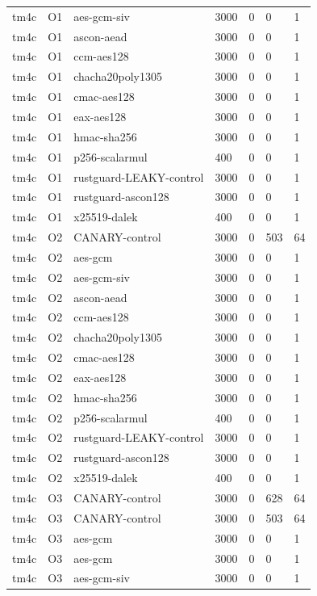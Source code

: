 \begin{table}[t]
\begin{tabular}{lllllll}
    tm4c & O1 & aes-gcm-siv & 3000 & 0 & 0 & 1 \\
    tm4c & O1 & ascon-aead & 3000 & 0 & 0 & 1 \\
    tm4c & O1 & ccm-aes128 & 3000 & 0 & 0 & 1 \\
    tm4c & O1 & chacha20poly1305 & 3000 & 0 & 0 & 1 \\
    tm4c & O1 & cmac-aes128 & 3000 & 0 & 0 & 1 \\
    tm4c & O1 & eax-aes128 & 3000 & 0 & 0 & 1 \\
    tm4c & O1 & hmac-sha256 & 3000 & 0 & 0 & 1 \\
    tm4c & O1 & p256-scalarmul & 400 & 0 & 0 & 1 \\
    tm4c & O1 & rustguard-LEAKY-control & 3000 & 0 & 0 & 1 \\
    tm4c & O1 & rustguard-ascon128 & 3000 & 0 & 0 & 1 \\
    tm4c & O1 & x25519-dalek & 400 & 0 & 0 & 1 \\
    tm4c & O2 & CANARY-control & 3000 & 0 & 503 & 64 \\
    tm4c & O2 & aes-gcm & 3000 & 0 & 0 & 1 \\
    tm4c & O2 & aes-gcm-siv & 3000 & 0 & 0 & 1 \\
    tm4c & O2 & ascon-aead & 3000 & 0 & 0 & 1 \\
    tm4c & O2 & ccm-aes128 & 3000 & 0 & 0 & 1 \\
    tm4c & O2 & chacha20poly1305 & 3000 & 0 & 0 & 1 \\
    tm4c & O2 & cmac-aes128 & 3000 & 0 & 0 & 1 \\
    tm4c & O2 & eax-aes128 & 3000 & 0 & 0 & 1 \\
    tm4c & O2 & hmac-sha256 & 3000 & 0 & 0 & 1 \\
    tm4c & O2 & p256-scalarmul & 400 & 0 & 0 & 1 \\
    tm4c & O2 & rustguard-LEAKY-control & 3000 & 0 & 0 & 1 \\
    tm4c & O2 & rustguard-ascon128 & 3000 & 0 & 0 & 1 \\
    tm4c & O2 & x25519-dalek & 400 & 0 & 0 & 1 \\
    tm4c & O3 & CANARY-control & 3000 & 0 & 628 & 64 \\
    tm4c & O3 & CANARY-control & 3000 & 0 & 503 & 64 \\
    tm4c & O3 & aes-gcm & 3000 & 0 & 0 & 1 \\
    tm4c & O3 & aes-gcm & 3000 & 0 & 0 & 1 \\
    tm4c & O3 & aes-gcm-siv & 3000 & 0 & 0 & 1 \\

\end{tabular}
\end{table}
